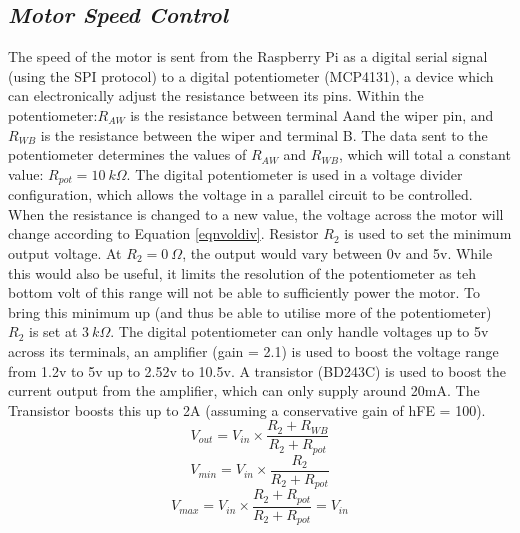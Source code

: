 \documentclass[twoside,a4]{report}
\begin{document}
	\subsection*{\textit{Motor Speed Control}} %
	The speed of the motor is sent from the Raspberry Pi as a digital serial signal (using the SPI protocol) to a digital potentiometer (MCP4131), a device which can electronically adjust the resistance between its pins. Within the potentiometer:\(R_{AW}\) is the resistance between terminal Aand the wiper pin, and \(R_{WB}\) is the resistance between the wiper and terminal B. The data sent to the potentiometer determines the values of \(R_{AW}\) and \(R_{WB}\), which will total a constant value: \(R_{pot} = 10\ k\Omega \). The digital potentiometer is used in a voltage divider configuration, which allows the voltage in a parallel circuit to be controlled. When the resistance is changed to a new value, the voltage across the motor will change according to Equation \ref{eqnvoldiv}. Resistor \(R_2\) is used to set the minimum output voltage. At \(R_2 = 0\ \Omega\), the output would vary between 0v and 5v. While this would also be useful, it limits the resolution of the potentiometer as teh bottom volt of this range will not be able to sufficiently power the motor. To bring this minimum up (and thus be able to utilise more of the potentiometer) \(R_2\) is set at \(3\ k\Omega \). The digital potentiometer can only handle voltages up to 5v across its terminals, an amplifier (gain = 2.1) is used to boost the voltage range from 1.2v to 5v up to 2.52v to 10.5v. A transistor (BD243C) is used to boost the current output from the amplifier, which can only supply around 20mA. The Transistor boosts this up to 2A (assuming a conservative gain of hFE = 100).
	\begin{equation}
		V_{out} = V_{in}\times \frac{R_2 + R_{WB}}{R_2 + R_{pot}}
		\label{eqnvoldiv}
	\end{equation}\newline
	\begin{equation}
		V_{min} = V_{in}\times \frac{R_2}{R_2 + R_{pot}}
		\label{eqnminvol}
	\end{equation}\newline
	\begin{equation}
		V_{max} = V_{in}\times \frac{R_2 + R_{pot}}{R_2 + R_{pot}} = V_{in}
		\label{eqnmaxvol}
	\end{equation}\newline \noindent
\end{document}
